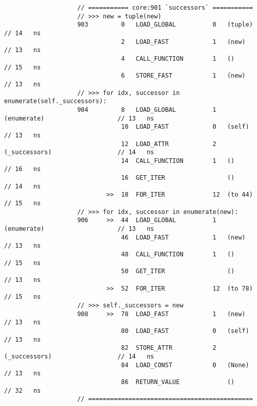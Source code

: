 \begin{code}
\begin{verbatim}
                    // =========== core:901 `successors` ===========
                    // >>> new = tuple(new)
                    903         0   LOAD_GLOBAL          0   (tuple)                        // 14   ns
                                2   LOAD_FAST            1   (new)                          // 13   ns
                                4   CALL_FUNCTION        1   ()                             // 15   ns
                                6   STORE_FAST           1   (new)                          // 13   ns
                    // >>> for idx, successor in enumerate(self._successors):
                    904         8   LOAD_GLOBAL          1   (enumerate)                    // 13   ns
                                10  LOAD_FAST            0   (self)                         // 13   ns
                                12  LOAD_ATTR            2   (_successors)                  // 14   ns
                                14  CALL_FUNCTION        1   ()                             // 16   ns
                                16  GET_ITER                 ()                             // 14   ns
                            >>  18  FOR_ITER             12  (to 44)                        // 15   ns
                    // >>> for idx, successor in enumerate(new):
                    906     >>  44  LOAD_GLOBAL          1   (enumerate)                    // 13   ns
                                46  LOAD_FAST            1   (new)                          // 13   ns
                                48  CALL_FUNCTION        1   ()                             // 15   ns
                                50  GET_ITER                 ()                             // 13   ns
                            >>  52  FOR_ITER             12  (to 78)                        // 15   ns
                    // >>> self._successors = new
                    908     >>  78  LOAD_FAST            1   (new)                          // 13   ns
                                80  LOAD_FAST            0   (self)                         // 13   ns
                                82  STORE_ATTR           2   (_successors)                  // 14   ns
                                84  LOAD_CONST           0   (None)                         // 13   ns
                                86  RETURN_VALUE             ()                             // 32   ns
                    // =============================================


\end{verbatim}
\end{code}
